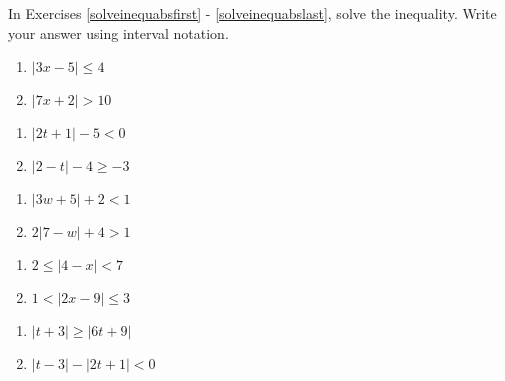 In Exercises \ref{solveinequabsfirst} - \ref{solveinequabslast}, solve the inequality.  Write your answer using interval notation. 

\begin{multicols}{2}
\begin{enumerate}
\setcounter{enumi}{\value{HW}}
\item $|3x - 5| \leq 4$ \label{solveinequabsfirst}
\item $|7x + 2| > 10$

\setcounter{HW}{\value{enumi}}
\end{enumerate}
\end{multicols}

\begin{multicols}{2}
\begin{enumerate}
\setcounter{enumi}{\value{HW}}

\item $|2t+1| - 5 < 0$   
\item $|2-t| - 4 \geq -3$

\setcounter{HW}{\value{enumi}}
\end{enumerate}
\end{multicols}

\begin{multicols}{2}
\begin{enumerate}
\setcounter{enumi}{\value{HW}}

\item $|3w+5| + 2 < 1$   
\item $2|7-w| +4 > 1$

\setcounter{HW}{\value{enumi}}
\end{enumerate}
\end{multicols}

\begin{multicols}{2}
\begin{enumerate}
\setcounter{enumi}{\value{HW}}

\item  $2 \leq |4-x| < 7$ 
\item $1 < |2x - 9| \leq 3$

\setcounter{HW}{\value{enumi}}
\end{enumerate}
\end{multicols}

\begin{multicols}{2}
\begin{enumerate}
\setcounter{enumi}{\value{HW}}

\item $|t + 3| \geq |6t + 9|$
\item  $|t-3| - |2t+1| < 0$ 

\setcounter{HW}{\value{enumi}}
\end{enumerate}
\end{multicols}

